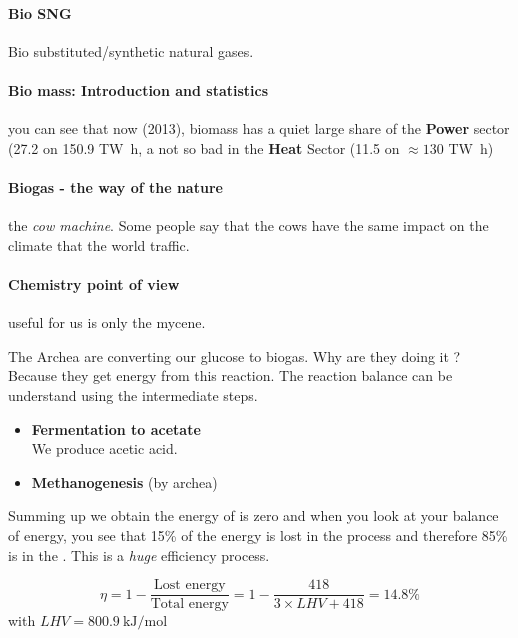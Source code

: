 \documentclass[10pt,a4paper]{article}
\begin{document}
 \paragraph{Bio SNG}Bio substituted/synthetic natural gases. 
 
 \paragraph{Bio mass: Introduction and statistics}you can see that now (2013), biomass has a quiet large share of the \textbf{Power} sector (27.2 on 150.9 \si{\tera\watt\hour}, a not so bad in the \textbf{Heat} Sector (11.5 on $\approx 130$ \si{\tera\watt\hour})
 
 \paragraph{Biogas - the way of the nature}the \textit{cow machine}. Some people say that the cows have the same impact on the climate that the world traffic.
 
 \paragraph{Chemistry point of view} useful for us is only the mycene.
 
 The Archea are converting our glucose to biogas. Why are they doing it ? Because they get energy from this reaction. The reaction balance can be understand using the intermediate steps.
 
 \begin{itemize}
 \item \textbf{Fermentation to acetate}  \\
 We produce acetic acid.
 \item \textbf{Methanogenesis} (by archea) 
 \end{itemize}
 
 Summing up we obtain  the energy of  is zero and when you look at your balance of energy, you see that 15\% of the energy is lost in the process and therefore 85\% is in the . This is a \emph{huge} efficiency process. 
 
 \begin{equation}
 \label{Rendement}
  \eta = 1- \frac{\text{Lost energy}}{\text{Total energy}} = 1 - \frac{418}{3 \times LHV + 418}= 14.8 \% 
 \end{equation} 
with $LHV = \SI{800.9}{\kilo\joule\per\mole} $
\end{document}
